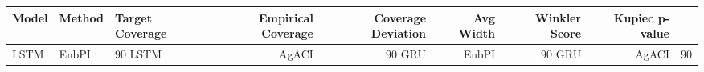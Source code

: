 \begin{tabular}{lllrrrrr}
\toprule
Model & Method & Target Coverage & Empirical Coverage & Coverage Deviation & Avg Width & Winkler Score & Kupiec p-value \\
\midrule
LSTM & EnbPI & 90%
LSTM & AgACI & 90%
GRU & EnbPI & 90%
GRU & AgACI & 90%
\bottomrule
\end{tabular}
